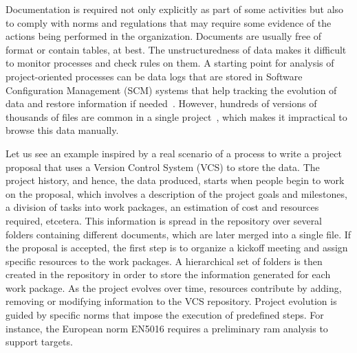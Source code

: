Documentation is required not only explicitly as part of some activities but also to comply with norms and regulations that may require some evidence of the actions being performed in the organization. Documents are usually free of format or contain tables, at best. The unstructuredness of data makes it difficult to monitor processes and check rules on them. A starting point for analysis of project-oriented processes can be data logs %
that are stored in Software Configuration Management (SCM) systems that help tracking the evolution of data and restore information if needed~\citep{voinea_open_2006}.
However, hundreds of versions of thousands of files are common in a single project~\citep{voinea_multiscale_2006}, which makes it impractical to browse this data manually.


Let us see an example inspired by a real scenario of a process to write a project proposal that uses a Version Control System (VCS) to store the data. The project history, and hence, the data produced, starts when people begin to work on the proposal, which involves a description of the project goals and milestones, a division of tasks into work packages, an estimation of cost and resources required, etcetera. This information is spread in the repository over several folders containing different documents, which are later merged into a single file. If the proposal is accepted, the first step is to organize a kickoff meeting and assign specific resources to the work packages. A hierarchical set of folders is then created in the repository in order to store the information generated for each work package. As the project evolves over time, resources contribute by adding, removing or modifying information to the VCS repository. %
Project evolution is guided by specific norms that impose the execution of predefined steps. For instance, the European norm EN5016 requires a preliminary \gls{ram} analysis to support targets. 

